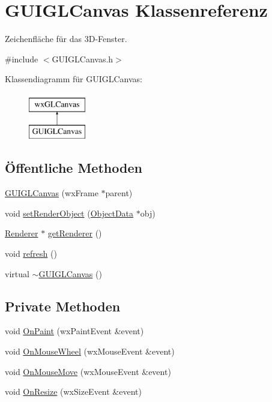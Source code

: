 \hypertarget{classGUIGLCanvas}{\section{G\-U\-I\-G\-L\-Canvas Klassenreferenz}
\label{classGUIGLCanvas}
}


Zeichenfläche für das 3\-D-\/\-Fenster.  




{\ttfamily \#include $<$G\-U\-I\-G\-L\-Canvas.\-h$>$}

Klassendiagramm für G\-U\-I\-G\-L\-Canvas\-:\begin{figure}[H]
\begin{center}
\leavevmode
\includegraphics[height=2.000000cm]{classGUIGLCanvas}
\end{center}
\end{figure}
\subsection*{Öffentliche Methoden}
\begin{DoxyCompactItemize}
\item 
\hyperlink{classGUIGLCanvas_ae77992061b501fa995c08cd568c2c6ad}{G\-U\-I\-G\-L\-Canvas} (wx\-Frame $\ast$parent)
\item 
void \hyperlink{classGUIGLCanvas_a643f11a7ef05829a6c48d037ad2c4b9b}{set\-Render\-Object} (\hyperlink{classObjectData}{Object\-Data} $\ast$obj)
\item 
\hyperlink{classRenderer}{Renderer} $\ast$ \hyperlink{classGUIGLCanvas_a57085ce831e09e627fe93f17a6c79dfa}{get\-Renderer} ()
\item 
void \hyperlink{classGUIGLCanvas_a883d5bc79fcfc6e2c9ceeb41a0c0e77e}{refresh} ()
\item 
virtual \hyperlink{classGUIGLCanvas_af6358f8d4e95c6864ff005d4764fffbc}{$\sim$\-G\-U\-I\-G\-L\-Canvas} ()
\end{DoxyCompactItemize}
\subsection*{Private Methoden}
\begin{DoxyCompactItemize}
\item 
void \hyperlink{classGUIGLCanvas_a83f52d08591920a339150c2f45069c8f}{On\-Paint} (wx\-Paint\-Event \&event)
\item 
void \hyperlink{classGUIGLCanvas_a0ee8fe9339ebb330b8133a620bd67514}{On\-Mouse\-Wheel} (wx\-Mouse\-Event \&event)
\item 
void \hyperlink{classGUIGLCanvas_a9c089336b9485f1abcc60a1a7fb85bb7}{On\-Mouse\-Move} (wx\-Mouse\-Event \&event)
\item 
void \hyperlink{classGUIGLCanvas_aba4aa683bf8226da8182779de38ef5db}{On\-Resize} (wx\-Size\-Event \&event)
\end{DoxyCompactItemize}

